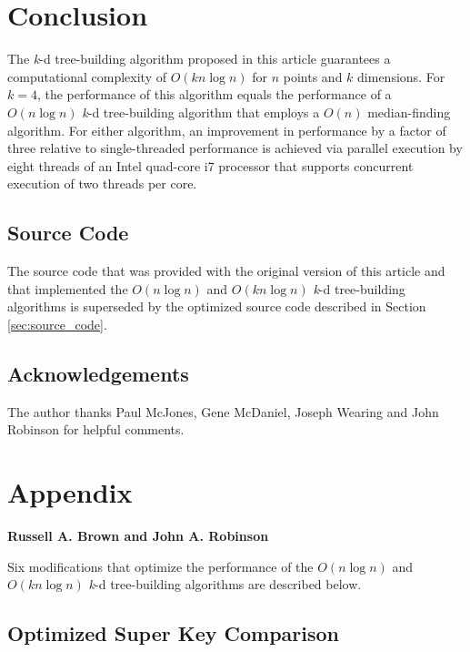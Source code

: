 \documentclass{sig-alternate}
\begin{document}
\section{Conclusion}
\label{sec:conclusion}

The \emph{k}-d tree-building algorithm proposed in this article guarantees a computational complexity of $O\left(kn \log n\right)$ for $n$ points and $k$ dimensions.  For $k=4$, the performance of this algorithm equals the performance of a $O\left(n \log n\right)$ \emph{k}-d tree-building algorithm that employs a $O(n)$ median-finding algorithm.  For either algorithm, an improvement in performance by a factor of three relative to single-threaded performance is achieved via parallel execution by eight threads of an Intel quad-core i7 processor that supports concurrent execution of two threads per core.

\subsection*{Source Code}

 The source code that was provided with the original version of this article \cite{Brown} and that implemented the $O\left(n \log n\right)$ and $O\left(kn \log n\right)$ \emph{k}-d tree-building algorithms is superseded by the optimized source code described in Section \ref{sec:source_code}.

\subsection*{Acknowledgements}

The author thanks Paul McJones, Gene McDaniel, Joseph Wearing and John Robinson for helpful comments.

\section{Appendix}
\label{sec:appendix}

\hfill \break \textbf{Russell A. Brown and John A. Robinson} \hfill \break

Six modifications that optimize the performance of the $O\left(n \log n\right)$ and $O\left(kn \log n\right)$ \emph{k}-d tree-building algorithms are described below.

\subsection{Optimized Super Key Comparison}
\end{document}
